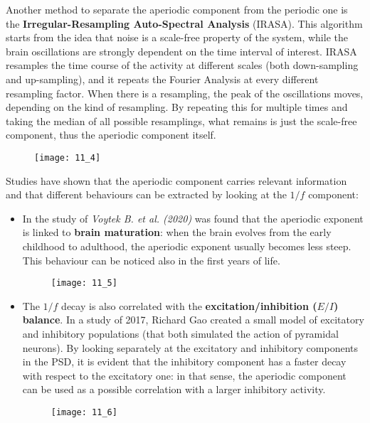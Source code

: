 Another method to separate the aperiodic component from the periodic one is the
\textbf{Irregular-Resampling Auto-Spectral Analysis} (IRASA). This algorithm starts from the idea
that noise is a scale-free property of the system, while the brain oscillations are strongly dependent on the
time interval of interest. IRASA resamples the time course of the activity at different scales (both
down-sampling and up-sampling), and it repeats the Fourier Analysis at every different resampling factor.
When there is a resampling, the peak of the oscillations moves, depending on the kind of resampling. By repeating
this for multiple times and taking the median of all possible resamplings, what remains is just the
scale-free component, thus the aperiodic component itself.
\begin{figure}[H]
    \texttt{[image: 11\_4]}
    \centering
\end{figure}
Studies have shown that the aperiodic component carries relevant information and that different behaviours
can be extracted by looking at the \(1/f\) component:
\begin{itemize}
    \item In the study of \textit{Voytek B. et al. (2020)} was found that the aperiodic exponent is linked
          to \textbf{brain maturation}: when the brain evolves from the early childhood to adulthood, the
          aperiodic exponent usually becomes less steep. This behaviour can be noticed also in the first years
          of life.
          \begin{figure}[H]
              \texttt{[image: 11\_5]}
              \centering
          \end{figure}
    \item The \(1/f\) decay is also correlated with the \textbf{excitation/inhibition (\(E/I\)) balance}.
          In a study of 2017, Richard Gao created a small model of excitatory and inhibitory populations
          (that both simulated the action of pyramidal neurons). By looking separately at the excitatory
          and inhibitory components in the PSD, it is evident that the inhibitory component has a faster
          decay with respect to the excitatory one: in that sense, the aperiodic component can be used as
          a possible correlation with a larger inhibitory activity.
          \begin{figure}[H]
              \texttt{[image: 11\_6]}
              \centering
          \end{figure}
\end{itemize}
